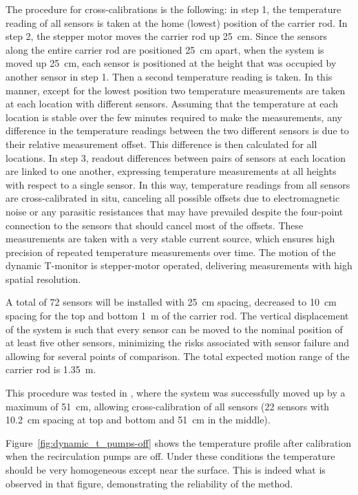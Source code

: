 The procedure for cross-calibrations is the following: in step 1, the temperature reading  of all sensors is taken at the home (lowest) position of the carrier rod. In  step 2, the stepper motor moves the carrier rod up \SI{25}{cm}. Since the sensors along the entire  carrier rod are positioned \SI{25}{cm} apart, when the system is moved up \SI{25}{cm}, each sensor is positioned at the height that was occupied by another sensor in step 1. Then a second temperature reading is taken. In this manner, except for the lowest position two temperature measurements are taken at each location with %
different sensors. Assuming that the temperature at each location is stable over the few minutes required to make the measurements, %
any difference in the temperature readings between the two different sensors is due to their relative measurement offset. This %
difference is then calculated for all locations.  In step 3, readout differences between pairs of sensors at each location are linked to one another, expressing temperature measurements at all heights with respect to a single sensor. In this way, temperature readings from all sensors are cross-calibrated %
in situ, canceling all possible offsets due to electromagnetic noise or any parasitic resistances that may have prevailed despite the four-point connection to the sensors that should cancel most of the offsets. These measurements are taken with a very stable current source, which ensures high precision of repeated temperature measurements over time. The motion of the dynamic T-monitor is stepper-motor operated, delivering measurements with high spatial resolution. 


A total of \num{72} sensors will be installed with \SI{25}{cm} spacing, decreased to \SI{10}{cm} spacing for the top and bottom \SI{1}{m} of the carrier rod.  
 The vertical displacement of the system is such that every sensor can be moved to the nominal position of at least five other sensors, minimizing the risks associated with sensor failure and allowing for several points of comparison. The total expected motion range of the carrier rod is \SI{1.35}{m}.



This procedure was tested in , where the system was successfully moved up by a maximum of \SI{51}{cm}, allowing cross-calibration of all sensors (22 sensors with \SI{10.2}{cm} spacing at top and bottom and \SI{51}{cm} in the middle). 

Figure~\ref{fig:dynamic_t_pumps-off} shows the temperature profile after calibration when the recirculation pumps are off. Under these conditions the  temperature should be very homogeneous except near the surface. This is indeed what is observed in that figure, demonstrating the reliability of the method.  

